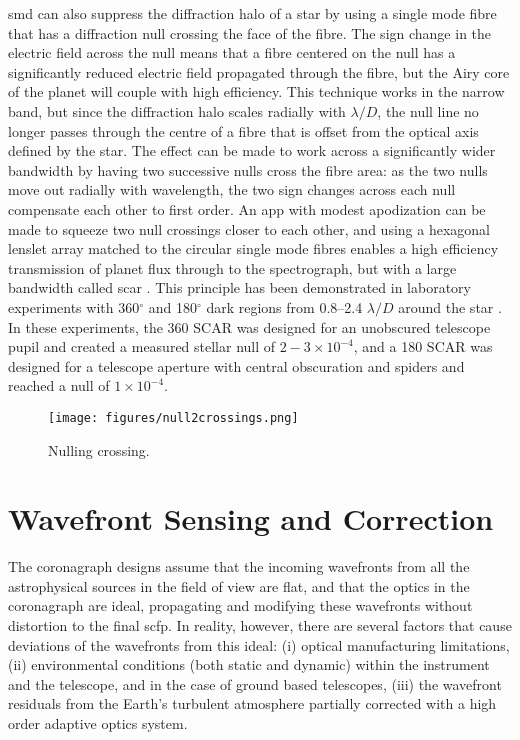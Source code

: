 \documentclass[letterpaper]{ar-1col}
\newcommand{\ld}{$\lambda/D$}
\begin{document}
\ac{smd} can also suppress the diffraction halo of a star by using a single mode fibre that has a diffraction null crossing the face of the fibre.
%
The sign change in the electric field across the null means that a fibre centered on the null has a significantly reduced electric field propagated through the fibre, but the Airy core of the planet will couple with high efficiency.
%
This technique works in the narrow band, but since the diffraction halo scales radially with \ld{}, the null line no longer passes through the centre of a fibre that is offset from the optical axis defined by the star.
%
The effect can be made to work across a significantly wider bandwidth by having two successive nulls cross the fibre area: as the two nulls move out radially with wavelength, the two sign changes across each null compensate each other to first order.
%
An \ac{app} with modest apodization can be made to squeeze two null crossings closer to each other, and using a hexagonal lenslet array matched to the circular single mode fibres enables a high efficiency transmission of planet flux \citep{haffert2021fundamental} through to the spectrograph, but with a large bandwidth called \acl{scar} \citep[\acs{scar}; ][]{Por20a,Haffert20}.
%
This principle has been demonstrated in laboratory experiments with 360$^\circ$ and 180$^\circ$ dark regions from 0.8–2.4 \ld{} around the star \citep{Haffert20}.
%
In these experiments, the 360 SCAR was designed for an unobscured telescope pupil and created a measured stellar null of $2-3 \times 10^{-4}$, and a 180 SCAR was designed for a telescope aperture with central obscuration and spiders and reached a null of $1\times 10^{-4}$. 

\begin{figure}[ht]
  \centering
  \texttt{[image: figures/null2crossings.png]}
  \caption{Nulling crossing.}
  \label{fig:scar}
\end{figure}

\section{Wavefront Sensing and Correction}

The coronagraph designs assume that the incoming wavefronts from all the astrophysical sources in the field of view are flat, and that the optics in the coronagraph are ideal, propagating and modifying these wavefronts without distortion to the final \ac{scfp}.
%
In reality, however, there are several factors that cause deviations of the wavefronts from this ideal: (i) optical manufacturing limitations, (ii) environmental conditions (both static and dynamic) within the instrument and the telescope, and in the case of ground based telescopes, (iii) the wavefront residuals from the Earth's turbulent atmosphere partially corrected with a high order adaptive optics system.
\end{document}
